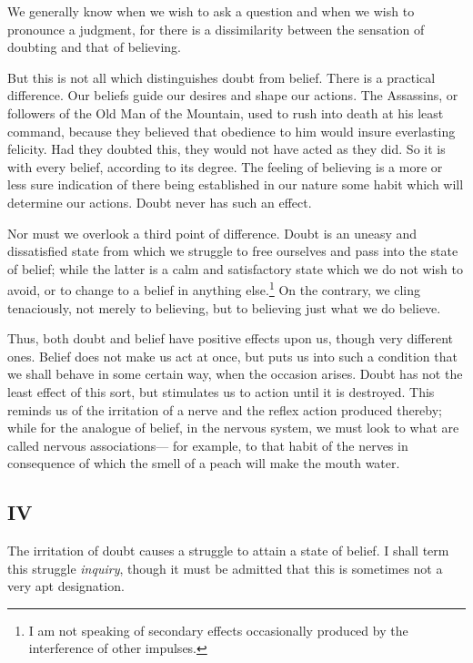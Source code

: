 \documentclass[]{article}
\newcounter{authornote}[page]
\newcommand{\authornote}[1]{\renewcommand{\thefootnote}{\fnsymbol{footnote}}\stepcounter{authornote}\footnote[\value{authornote}]{#1}\renewcommand{\thefootnote}{\arabic{footnote}}}
\begin{document}
We generally know when we wish to ask a question and when we wish to pronounce a judgment, for there is a dissimilarity between the sensation of doubting and that of believing.

But this is not all which distinguishes doubt from belief. There is a practical difference. Our beliefs guide our desires and shape our actions. The Assassins, or followers of the Old Man of the Mountain, used to rush into death at his least command, because they believed that obedience to him would insure everlasting felicity. Had they doubted this, they would not have acted as they did. So it is with every belief, according to its degree. The feeling of believing is a more or less sure indication of there being established in our nature some habit which will determine our actions. Doubt never has such an effect.

Nor must we overlook a third point of difference. Doubt is an uneasy and dissatisfied state from which we struggle to free ourselves and pass into the state of belief; while the latter is a calm and satisfactory state which we do not wish to avoid, or to change to a belief in anything else.\authornote{ I am not speaking of secondary effects occasionally produced by the interference of other impulses.} On the contrary, we cling tenaciously, not merely to believing, but to believing just what we do believe.


Thus, both doubt and belief have positive effects upon us, though very different ones. Belief does not make us act at once, but puts us into such a condition that we shall behave in some certain way, when the occasion arises. Doubt has not the least effect of this sort, but stimulates us to action until it is destroyed. This reminds us of the irritation of a nerve and the reflex action produced thereby; while for the analogue of belief, in the nervous system, we must look to what are called nervous associations--- for example, to that habit of the nerves in consequence of which the smell of a peach will make the mouth water.

\subsection*{IV}

The irritation of doubt causes a struggle to attain a state of belief. I shall term this struggle \emph{inquiry}, though it must be admitted that this is sometimes not a very apt designation.
\end{document}
